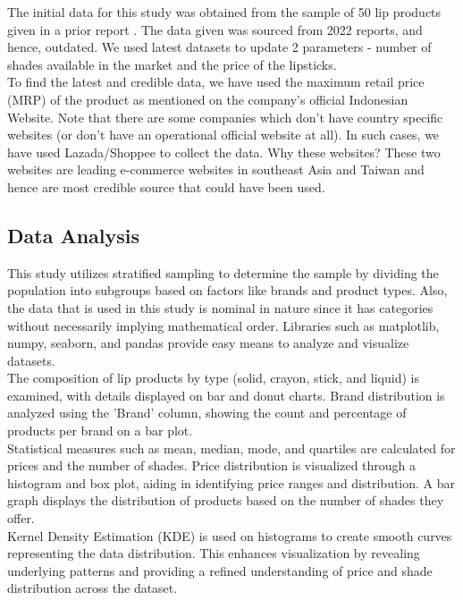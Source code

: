 \documentclass{article}
\begin{document}
\noindent The initial data for this study was obtained from the sample of 50 lip products given in a prior report \cite{casestudy}. The data given was sourced from 2022 reports, and hence, outdated. We used latest datasets to update 2 parameters - number of shades available in the market and the price of the lipsticks. \\

\noindent To find the latest and credible data, we have used the maximum retail price (MRP) of the product as mentioned on the company's official Indonesian Website. Note that there are some companies which don't have country specific websites (or don't have an operational official website at all). In such cases, we have used Lazada/Shoppee to collect the data. Why these websites? These two websites are leading e-commerce websites in southeast Asia and Taiwan and hence are most credible source that could have been used.

\subsection{Data Analysis}

This study utilizes stratified sampling to determine the sample by dividing the population into subgroups based on factors like brands and product types. Also, the data that is used in this study is nominal in nature since it has categories without necessarily implying mathematical order. Libraries such as matplotlib, numpy, seaborn, and pandas provide easy means to analyze and visualize datasets. \\

\noindent The composition of lip products by type (solid, crayon, stick, and liquid) is examined, with details displayed on bar and donut charts. Brand distribution is analyzed using the 'Brand' column, showing the count and percentage of products per brand on a bar plot. \\

\noindent Statistical measures such as mean, median, mode, and quartiles are calculated for prices and the number of shades. Price distribution is visualized through a histogram and box plot, aiding in identifying price ranges and distribution. A bar graph displays the distribution of products based on the number of shades they offer. \\

\noindent Kernel Density Estimation (KDE) is used on histograms to create smooth curves representing the data distribution. This enhances visualization by revealing underlying patterns and providing a refined understanding of price and shade distribution across the dataset. \\
\end{document}
